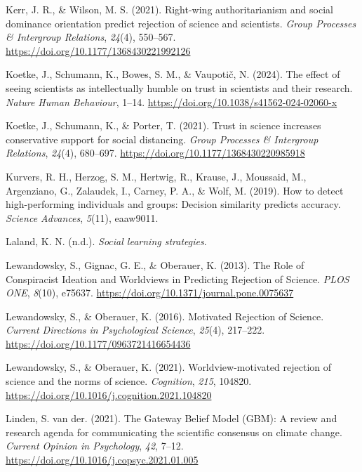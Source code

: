 \documentclass[
  jou,
  floatsintext,
  longtable,
  nolmodern,
  notxfonts,
  notimes,
  colorlinks=true,linkcolor=blue,citecolor=blue,urlcolor=blue]{apa7}
\newlength{\cslhangindent}
\newenvironment{CSLReferences}[2] %
 {\begin{list}{}{%
  \setlength{\itemindent}{0pt}
  \setlength{\leftmargin}{0pt}
  \setlength{\parsep}{0pt}
  \ifodd #1
   \setlength{\leftmargin}{\cslhangindent}
   \setlength{\itemindent}{-1\cslhangindent}
  \fi
  \setlength{\itemsep}{#2\baselineskip}}}
 {\end{list}}
\begin{document}
\begin{CSLReferences}{1}{0}
Kerr, J. R., \& Wilson, M. S. (2021). Right-wing authoritarianism and
social dominance orientation predict rejection of science and
scientists. \emph{Group Processes \& Intergroup Relations},
\emph{24}(4), 550--567. \url{https://doi.org/10.1177/1368430221992126}

Koetke, J., Schumann, K., Bowes, S. M., \& Vaupotič, N. (2024). The
effect of seeing scientists as intellectually humble on trust in
scientists and their research. \emph{Nature Human Behaviour}, 1--14.
\url{https://doi.org/10.1038/s41562-024-02060-x}

Koetke, J., Schumann, K., \& Porter, T. (2021). Trust in science
increases conservative support for social distancing. \emph{Group
Processes \& Intergroup Relations}, \emph{24}(4), 680--697.
\url{https://doi.org/10.1177/1368430220985918}

Kurvers, R. H., Herzog, S. M., Hertwig, R., Krause, J., Moussaid, M.,
Argenziano, G., Zalaudek, I., Carney, P. A., \& Wolf, M. (2019). How to
detect high-performing individuals and groups: Decision similarity
predicts accuracy. \emph{Science Advances}, \emph{5}(11), eaaw9011.

Laland, K. N. (n.d.). \emph{Social learning strategies}.

Lewandowsky, S., Gignac, G. E., \& Oberauer, K. (2013). The Role of
Conspiracist Ideation and Worldviews in Predicting Rejection of Science.
\emph{PLOS ONE}, \emph{8}(10), e75637.
\url{https://doi.org/10.1371/journal.pone.0075637}

Lewandowsky, S., \& Oberauer, K. (2016). Motivated Rejection of Science.
\emph{Current Directions in Psychological Science}, \emph{25}(4),
217--222. \url{https://doi.org/10.1177/0963721416654436}

Lewandowsky, S., \& Oberauer, K. (2021). Worldview-motivated rejection
of science and the norms of science. \emph{Cognition}, \emph{215},
104820. \url{https://doi.org/10.1016/j.cognition.2021.104820}

Linden, S. van der. (2021). The Gateway Belief Model (GBM): A review and
research agenda for communicating the scientific consensus on climate
change. \emph{Current Opinion in Psychology}, \emph{42}, 7--12.
\url{https://doi.org/10.1016/j.copsyc.2021.01.005}


\end{CSLReferences}
\end{document}
